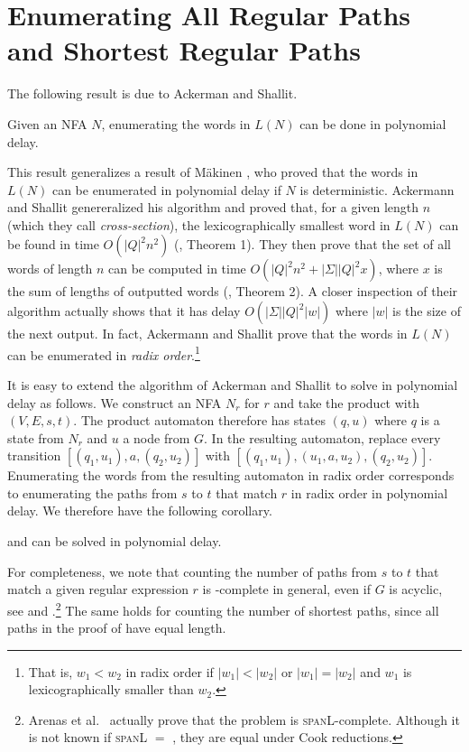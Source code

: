 \documentclass[a4paper,english]{lipics-v2016}
\theoremstyle{plain}
\begin{document}
\makeatletter{}\section{Enumerating All Regular Paths and Shortest Regular Paths}\label{sec:enumerate}
The following result is due to Ackerman and Shallit.
\begin{theorem} \label{theo:ackermanAndShallit}
  Given an NFA $N$, enumerating the words in $L(N)$ 
    can be done in polynomial delay.
\end{theorem}
This result generalizes a result of M\"akinen
\cite{Makinen-actaCyber97}, who proved that the words in $L(N)$ can be
enumerated in polynomial delay if $N$ is deterministic. Ackermann and
Shallit genereralized his algorithm and proved that, for a given length
$n$ (which they call \emph{cross-section}), the lexicographically
smallest word in $L(N)$ can be found in time $O(|Q|^2n^2)$
(\cite{Ackerman-TCS09}, Theorem 1). They then prove that the set of
all words of length $n$ can be computed in time $O(|Q|^2n^2 + |\Sigma|
|Q|^2 x)$, where $x$ is the sum of lengths of outputted words
(\cite{Ackerman-TCS09}, Theorem 2). A closer inspection of their
algorithm actually shows that it has delay $O(|\Sigma| |Q|^2 |w|)$
where $|w|$ is the size of the next output.
In fact, Ackermann and Shallit prove that the words in $L(N)$ can be
enumerated in \emph{radix order}.\footnote{That is, $w_1 < w_2$ in
  radix order if $|w_1| < |w_2|$ or $|w_1| = |w_2|$ and $w_1$ is
  lexicographically smaller than $w_2$.} 


It is easy to extend the algorithm of Ackerman and Shallit to solve
\enumpaths in polynomial delay as follows. We construct an NFA $N_r$
for $r$ and take the product with $(V,E,s,t)$. The product automaton
therefore has states $(q,u)$ where $q$ is a state from $N_r$ and $u$ a
node from $G$. In the resulting automaton, replace every transition
$[(q_1,u_1), a, (q_2,u_2)]$ 
with 
$[(q_1,u_1), (u_1,a,u_2), (q_2,u_2)]$.  Enumerating the words from the
resulting automaton in radix order corresponds to enumerating the
paths from $s$ to $t$ that match $r$ in radix order in polynomial
delay. We therefore have the following corollary.
\begin{corollary}
  \enumpaths and \enumshortpaths can be solved in polynomial delay.
\end{corollary}

For completeness, we note that counting the number of paths from $s$
to $t$ that match a given regular expression $r$ is \sharpp-complete
in general, even if $G$ is acyclic, see \cite[Theorem 4.8(1)]{LosemannM-tods13}
and \cite[Theorem 6.1]{ArenasCP-www12}.\footnote{Arenas et al.~\cite{ArenasCP-www12}
  actually prove that the problem is \textsc{spanL}-complete. Although
  it is not known if \textsc{spanL} $=$ \sharpp, they are equal under
  Cook reductions.} The
same holds for counting the number of shortest paths, since all paths
in the proof of \cite[Theorem 4.8(1)]{LosemannM-tods13} have equal length.
\end{document}
